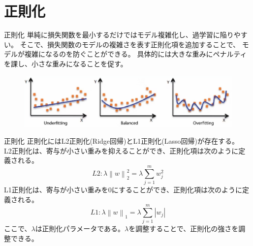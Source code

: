 \documentclass[aspectratio=169, dvipdfmx, 11pt]{beamer} %
\begin{document}
\section{正則化}
\begin{frame}{正則化}
    単純に損失関数を最小するだけではモデル複雑化し、過学習に陥りやすい。
    そこで、損失関数のモデルの複雑さを表す正則化項を追加することで、
    モデルが複雑になるのを防ぐことができる。
    具体的には大きな重みにペナルティを課し、小さな重みになることを促す。
    \vspace{2em}
    \begin{figure}[b]
        \begin{center}
        \includegraphics[width=140mm]{img/day04/fig01.png}
        \end{center}
    \end{figure}
\end{frame}

\begin{frame}{正則化}
    正則化にはL2正則化(Ridge回帰)とL1正則化(Lasso回帰)が存在する。\\
    \vspace{1em}
    L2正則化は、寄与が小さい重みを抑えることができ、正則化項は次のように定義される。
    \begin{equation*}
        L2:\lambda {\left\lVert w \right\rVert}_{2}^{2} = \lambda \sum_{j=1}^{m}w_{j}^{2}
    \end{equation*}
    \vspace{1em}
    L1正則化は、寄与が小さい重みを0にすることができ、正則化項は次のように定義される。
    \begin{equation*}
        L1:\lambda {\left\lVert w \right\rVert}_1 = \lambda \sum_{j=1}^{m} |w_j|
    \end{equation*}
    ここで、\(\lambda\)は正則化パラメータである。\(\lambda\)を調整することで、正則化の強さを調整できる。
\end{frame}
\end{document}

